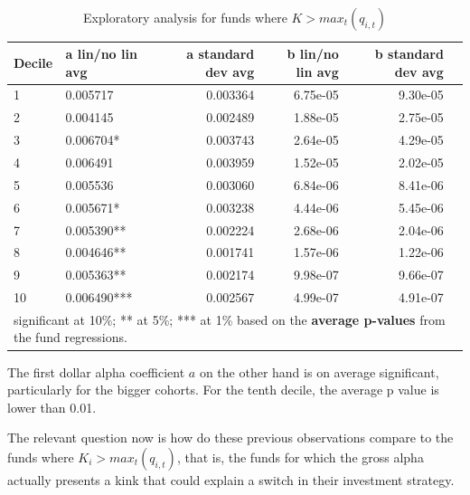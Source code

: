 \documentclass[12pt]{article}
\begin{document}
\begin{table}[h!]
    \centering
    \caption{Exploratory analysis for funds where $K>max_t(q_{i,t})$}
    \label{tab:decile-estimates-final-pvals}
    \begin{tabular}{llrrrr}
        \toprule
        Decile & a lin/no lin avg & a standard dev avg & b lin/no lin avg & b standard dev avg \\
        \midrule
        1 & 0.005717 & 0.003364 & 6.75e-05 & 9.30e-05 \\
        2 & 0.004145 & 0.002489 & 1.88e-05 & 2.75e-05 \\
        3 & 0.006704* & 0.003743 & 2.64e-05 & 4.29e-05 \\
        4 & 0.006491 & 0.003959 & 1.52e-05 & 2.02e-05 \\
        5 & 0.005536 & 0.003060 & 6.84e-06 & 8.41e-06 \\
        6 & 0.005671* & 0.003238 & 4.44e-06 & 5.45e-06\\
        7 & 0.005390** & 0.002224 & 2.68e-06 & 2.04e-06 \\
        8 & 0.004646** & 0.001741 & 1.57e-06 & 1.22e-06 \\
        9 & 0.005363** & 0.002174 & 9.98e-07 & 9.66e-07 \\
        10 & 0.006490*** & 0.002567 & 4.99e-07 & 4.91e-07 \\
        \bottomrule
        \multicolumn{6}{l}{\footnotesize * significant at 10\%; ** at 5\%; *** at 1\% based on the \textbf{average p-values} from the fund regressions.}
    \end{tabular}
\end{table}

The first dollar alpha coefficient $a$ on the other hand is on average significant, particularly for the bigger cohorts. For the tenth decile, the average p value is lower than 0.01.


\par
The relevant question now is how do these previous observations compare to the funds where $K_i>max_t(q_{i,t})$, that is, the funds for which the gross alpha actually presents a kink that could explain a switch in their investment strategy.
\end{document}
